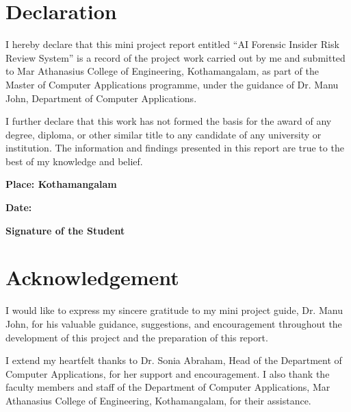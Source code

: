 \documentclass[12pt,a4paper,oneside]{report}
\renewcommand{\headrulewidth}{0.4pt}
\renewcommand{\footrulewidth}{0.4pt}
\renewcommand{\headrulewidth}{0.4pt}
\renewcommand{\footrulewidth}{0.4pt}
\begin{document}

\fancypagestyle{plain}{
  \fancyhf{}
  \fancyfoot[C]{\textit{\thepage}}
  \renewcommand{\headrulewidth}{0pt}
  \renewcommand{\footrulewidth}{0pt}
}
\pagestyle{plain}
\chapter*{Declaration}

I hereby declare that this mini project report entitled “AI Forensic Insider Risk Review System” is a record of the project work carried out by me and submitted to Mar Athanasius College of Engineering, Kothamangalam, as part of the Master of Computer Applications programme, under the guidance of Dr. Manu John, Department of Computer Applications.

\vspace{0.4cm}
I further declare that this work has not formed the basis for the award of any degree, diploma, or other similar title to any candidate of any university or institution. The information and findings presented in this report are true to the best of my knowledge and belief.

\vspace{2.0cm}
\noindent
\begin{minipage}[t]{0.45\textwidth}
\textbf{Place: Kothamangalam}

\vspace{0.1cm}
\textbf{Date:}
\end{minipage}
\hfill
\begin{minipage}[t]{0.4\textwidth}
\centering
\vspace{0.7cm}
\textbf{Signature of the Student}
\end{minipage}
\clearpage

\chapter*{Acknowledgement}

  I would like to express my sincere gratitude to my mini project guide, Dr. Manu John, for his valuable guidance, suggestions, and encouragement throughout the development of this project and the preparation of this report.

I extend my heartfelt thanks to Dr. Sonia Abraham, Head of the Department of Computer Applications, for her support and encouragement. I also thank the faculty members and staff of the Department of Computer Applications, Mar Athanasius College of Engineering, Kothamangalam, for their assistance.
\end{document}
